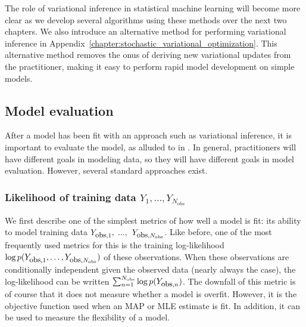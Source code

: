 The role of variational inference in statistical machine learning will
become more clear as we develop several algorithms using these methods
over the next two chapters.  We also introduce an alternative
method for performing variational inference in
Appendix~\ref{chapter:stochastic_variational_optimization}.  This
alternative method removes the onus of deriving new variational
updates from the practitioner, making it easy to perform rapid model
development on simple models.


\subsection{Model evaluation}
After a model has been fit with an approach such as variational
inference, it is important to evaluate the model, as alluded to in
.  In general, practitioners will have
different goals in modeling data, so they will have different goals in
model evaluation.  However, several standard approaches exist.

\subsubsection{Likelihood of training data $Y_1, \ldots, Y_{N_{\mbox{obs}}}$}
We first describe one of the simplest metrics of how well a model is fit:
its ability to model training data $Y_{\mbox{\small obs},1},$
$\ldots,$ $Y_{\mbox{\small obs},N_{\mbox{\tiny obs}}}$.  Like before,
one of the most frequently used metrics for this is the training
log-likelihood $\log p(Y_{\mbox{\small obs},1}, \ldots,
Y_{\mbox{\small obs},N_{\mbox{\tiny obs}}})$ of these
observations. When these observations are conditionally independent
given the observed data (nearly always the case), the log-likelihood
can be written $\sum_{n=1}^{N_{\mbox{\tiny obs}}} \log
p(Y_{\mbox{\small obs},n})$.  The downfall of this metric is of course
that it does not measure whether a model is overfit.  However, it is
the objective function used when an MAP or MLE estimate is
fit.  In addition, it can be used to measure the flexibility of a model.

